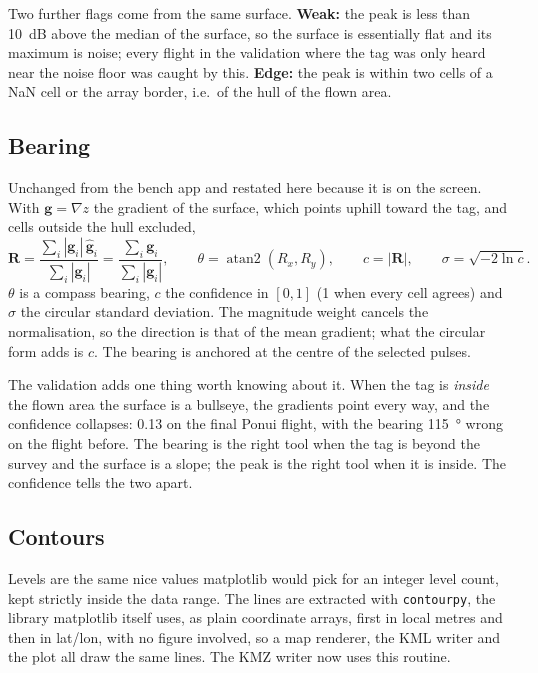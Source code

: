 \documentclass[11pt,a4paper]{article}
\newcommand{\code}[1]{\texttt{\small #1}}
\begin{document}
Two further flags come from the same surface. \textbf{Weak:} the peak is less than
\SI{10}{dB} above the median of the surface, so the surface is essentially flat and its
maximum is noise; every flight in the validation where the tag was only heard near the noise
floor was caught by this. \textbf{Edge:} the peak is within two cells of a NaN cell or the
array border, i.e.\ of the hull of the flown area.

\subsection{Bearing}

Unchanged from the bench app and restated here because it is on the screen. With $\mathbf{g}
= \nabla z$ the gradient of the surface, which points uphill toward the tag, and cells
outside the hull excluded,
\begin{equation}
\mathbf{R} = \frac{\sum_i |\mathbf{g}_i|\,\hat{\mathbf{g}}_i}{\sum_i |\mathbf{g}_i|}
           = \frac{\sum_i \mathbf{g}_i}{\sum_i |\mathbf{g}_i|},
\qquad
\theta = \operatorname{atan2}(R_x, R_y),
\qquad
c = |\mathbf{R}|,
\qquad
\sigma = \sqrt{-2\ln c}.
\end{equation}
$\theta$ is a compass bearing, $c$ the confidence in $[0,1]$ (1 when every cell agrees) and
$\sigma$ the circular standard deviation. The magnitude weight cancels the normalisation, so
the direction is that of the mean gradient; what the circular form adds is $c$. The bearing is
anchored at the centre of the selected pulses.

The validation adds one thing worth knowing about it. When the tag is \emph{inside} the flown
area the surface is a bullseye, the gradients point every way, and the confidence collapses:
0.13 on the final Ponui flight, with the bearing \SI{115}{\degree} wrong on the flight before.
The bearing is the right tool when the tag is beyond the survey and the surface is a slope;
the peak is the right tool when it is inside. The confidence tells the two apart.

\subsection{Contours}

Levels are the same nice values matplotlib would pick for an integer level count, kept
strictly inside the data range. The lines are extracted with \code{contourpy}, the library
matplotlib itself uses, as plain coordinate arrays, first in local metres and then in
lat/lon, with no figure involved, so a map renderer, the KML writer and the plot all draw
the same lines. The KMZ writer now uses this routine.
\end{document}
